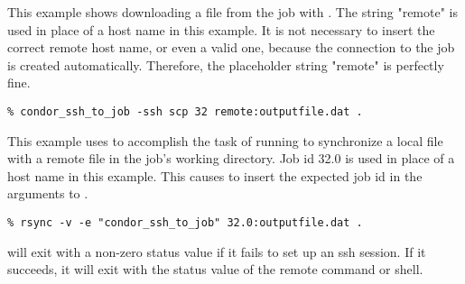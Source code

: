 \begin{ManPage}
This example shows downloading a file from the job with .
The string "remote" is used in place of a host name in this example.
It is not necessary to insert the correct remote host name, or even
a valid one, because the connection to the job is created automatically.
Therefore, the placeholder string "remote" is perfectly fine.
\footnotesize
\begin{verbatim}
% condor_ssh_to_job -ssh scp 32 remote:outputfile.dat .
\end{verbatim}
\normalsize

This example uses  to accomplish the
task of running  to synchronize a local file with
a remote file in the job's working directory.
Job id 32.0 is used in place of a host name in this example.
This causes  to insert the expected job id in the
arguments to .
\footnotesize
\begin{verbatim}
% rsync -v -e "condor_ssh_to_job" 32.0:outputfile.dat .
\end{verbatim}
\normalsize

\ExitStatus

 will exit with a non-zero status value if it fails
to set up an ssh session.  If it succeeds, it will exit with the
status value of the remote command or shell.

\end{ManPage}
